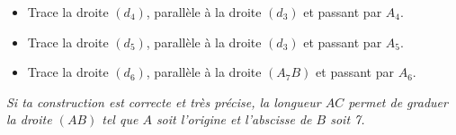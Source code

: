 \begin{itemize}
\begin{quote}
{\begin{minipage}{1.0\linewidth}
      \end{minipage}
      }
  \end{quote}
\item Trace la droite $(d_4)$, parallèle à la droite $(d_3)$ et
  passant par $A_4$.
\item Trace la droite $(d_5)$, parallèle à la droite $(d_3)$ et
  passant par $A_5$.
  \begin{quote}
  \end{quote}
\item Trace la droite $(d_6)$, parallèle à la droite $(A_7B)$ et
  passant par $A_6$.
\end{itemize}
{\em Si ta construction est correcte et très précise, la longueur $AC$
  permet de graduer la droite $(AB)$ tel que $A$ soit l'origine et
  l'abscisse de $B$ soit 7.}

